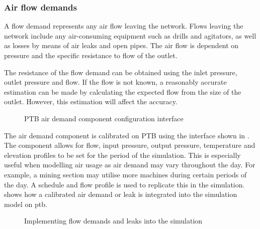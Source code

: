 		\subsubsection{Air flow demands}
			A flow demand represents any air flow leaving the network. Flows leaving the network include any air-consuming equipment such as drills and agitators, as well as losses by means of air leaks and open pipes. The air flow is dependent on pressure and the specific resistance to flow of the outlet. 
			\par 
			\clearpage
			The resistance of the flow demand can be obtained using the inlet pressure, outlet pressure and flow. If the flow is not known, a reasonably accurate estimation can be made by calculating the expected flow from the size of the outlet. However, this estimation will affect the accuracy.
			\par
			\begin{figure}[h]
				\centering
				\caption{PTB air demand component configuration interface}
				\label{fig: DemandInput}
			\end{figure}
		The air demand component is calibrated on PTB using the interface shown in . The component allows for flow, input pressure, output pressure, temperature and elevation profiles to be set for the period of the simulation. This is especially useful when modelling air usage as air demand may vary throughout the day. For example, a mining section may utilise more machines during certain periods of the day. A schedule and flow profile is used to replicate this in the simulation.  shows how a calibrated air demand or leak is integrated into the simulation model on \gls{ptb}.
			\begin{figure}[h]
				\centering
				\caption{Implementing flow demands and leaks into the simulation} 
				\label{fig: Demand component}
			\end{figure}
